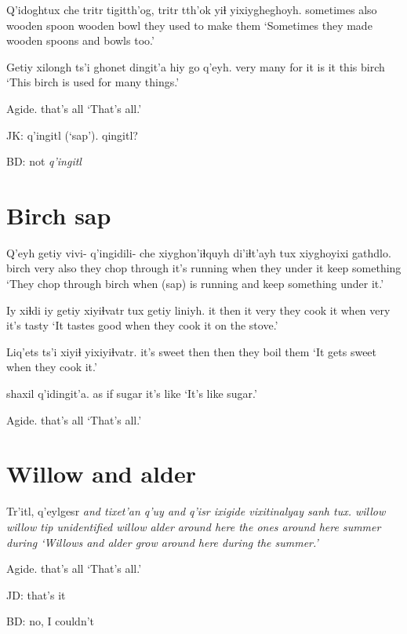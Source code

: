 \documentclass[12pt]{article}
\begin{document}
\gll Q'idoghtux che tritr tigitth'og, tritr tth'ok yiɬ yixiygheghoyh.
sometimes  also wooden spoon wooden bowl {} {they used to make them}
\glt `Sometimes they made wooden spoons and bowls too.'
\glend

\gll Getiy {xilongh ts'i} ghonet dingit'a hiy go q'eyh.
very  many           for   {it is} it this birch
\glt `This birch is used for many things.'
\glend

\gll Agide.
{{that's all}}
\glt `That's all.'
\glend

JK:  q'ingitl (`sap'). qingitl?

BD:  not \em q'ingitl \em 
 
\section{Birch sap}

\gll Q'eyh getiy vivi- q'ingidili-  che xiyghon'iɬquyh         di'iɬt'ayh tux        xiyghoyixi gathdlo.
birch very {} {} also {they chop through} {it's running} when {they under it} {keep something}
\glt `They chop through birch when (sap) is running and keep something under it.'
\glend

\gll Iy xiɬdi iy getiy xiyiɬvatr tux getiy liniyh.
it then  it very {they cook it} when very {it's tasty}
\glt `It tastes good when they cook it on the stove.'
\glend

\gll Liq'ets ts'i  xiyiɬ yixiyiɬvatr.
{it's sweet} then then {they boil them}
\glt `It gets sweet when they cook it.'
\glend

 shaxil q'idingit'a.
{as if}  sugar {it's like}
\glt `It's like sugar.'
\glend

\gll Agide.
{{that's all}}
\glt `That's all.'
\glend

\section{Willow and alder}

\gll Tr'itl, q'eylgesr \em and {tixet'an q'uy} \em and q'isr ixigide vixitinalyay sanh tux.
willow  {willow tip} {} {unidentified willow} {} alder {around here} {the ones around here} summer during
\glt `Willows and alder grow around here during the summer.'
\glend

\gll Agide.
{{that's all}}
\glt `That's all.'
\glend

JD:  that's it

BD:  no, I couldn't
\end{document}
